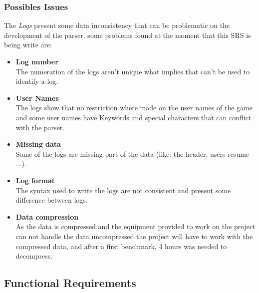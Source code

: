 \documentclass{scrreprt}
\begin{document}
\subsubsection{Possibles Issues}
The \textit{Logs} present some data inconsistency that can be problematic on the
development of the parser.
some problems found at the moment that this SRS is being write are:
\begin{itemize}
  \item \textbf{Log number}\\
    The numeration of the logs aren't unique what implies that can't be used to
    identify a log.
  \item \textbf{User Names}\\
    The logs show that no restriction where made on the user names of the game
    and some user names have Keywords and special characters that can conflict
    with the parser.
   \item \textbf{Missing data}\\
     Some of the logs are missing part of the data (like: the header, users
     resume $\ldots$).
   \item \textbf{Log format}\\
     The syntax used to write the logs are not consistent and present some
     difference between logs.
    \item \textbf{Data compression}\\
      As the data is compressed and the equipment provided to work on the
      project can not handle the data uncompressed the project will have to work
      with the compressed data, and after a first benchmark, 4 hours was needed
      to decompress.
\end{itemize}


\subsection{Functional Requirements}

\end{document}
